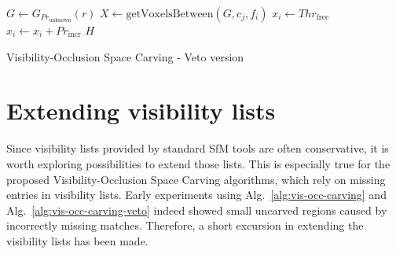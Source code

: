 {\singlespacing
\begin{algorithm}[!h]
  \centering
  \begin{algorithmic}[1]
      \State $G \gets G_{Pr_{\textrm{unknown}}}(r)$ 
           
            \State $X \gets \mathrm{getVoxelsBetween}(G, c_j, f_i)$ 
             
                \State $x_i \gets Thr_{\textrm{free}}$ 
              \EndFor
            \Else {}
                 
                  \State $x_i \gets x_i + Pr_{\textrm{incr}}$ 
                \EndIf
              \EndFor
            \EndIf
          \EndIf
        \EndFor
      \EndFor
      \State \Return $H$
    \EndFunction
  \end{algorithmic}
  \caption{Visibility-Occlusion Space Carving - Veto version}
  \label{alg:vis-occ-carving-veto}
\end{algorithm}
}

\section{Extending visibility lists}  \label{extend-vis-lists}
Since visibility lists provided by standard SfM tools are often conservative, it is worth exploring possibilities to extend those lists. This is especially true for the proposed Visibility-Occlusion Space Carving algorithms, which rely on missing entries in visibility lists. Early experiments using Alg.~\ref{alg:vis-occ-carving} and Alg.~\ref{alg:vis-occ-carving-veto} indeed showed small uncarved regions caused by incorrectly missing matches. Therefore, a short excursion in extending the visibility lists has been made.

